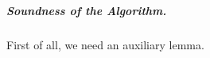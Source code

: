 \documentclass[10pt,a4paper]{article}
\theoremstyle{remark}
\begin{document}
\subparagraph{Soundness of the Algorithm.} First of all, we need an auxiliary lemma.
\end{document}
